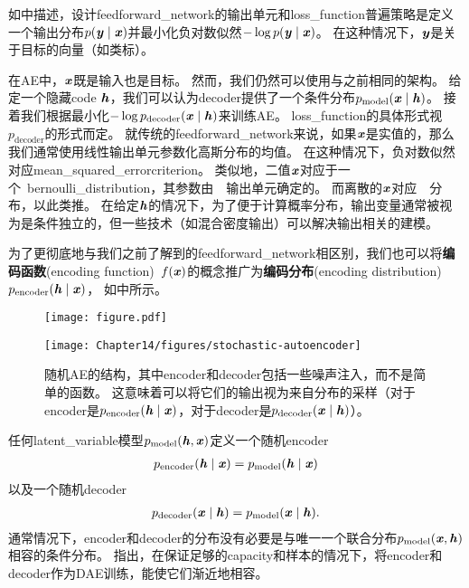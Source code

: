 如中描述，设计\gls{feedforward_network}的输出单元和\gls{loss_function}普遍策略是定义一个输出分布$p(\boldsymbol{\mathit{y}} \mid \boldsymbol{\mathit{x}}) $并最小化负对数似然$-\log p(\boldsymbol{\mathit{y}} \mid \boldsymbol{\mathit{x}})$。
在这种情况下，$\boldsymbol{\mathit{y}}$是关于目标的向量（如类标）。


在\gls{AE}中，$\boldsymbol{\mathit{x}}$既是输入也是目标。
然而，我们仍然可以使用与之前相同的架构。
给定一个隐藏\gls{code} $\boldsymbol{\mathit{h}}$，我们可以认为\gls{decoder}提供了一个条件分布$p_{\text{model}}(\boldsymbol{\mathit{x}} \mid \boldsymbol{\mathit{h}})$。
接着我们根据最小化$-\log p_{\text{decoder}}(\boldsymbol{\mathit{x}} \mid \boldsymbol{\mathit{h}})$来训练\gls{AE}。
\gls{loss_function}的具体形式视$p_{\text{decoder}}$的形式而定。
就传统的\gls{feedforward_network}来说，如果$\boldsymbol{\mathit{x}}$是实值的，那么我们通常使用线性输出单元参数化高斯分布的均值。
在这种情况下，负对数似然对应\gls{mean_squared_error}\gls{criterion}。
类似地，二值$\boldsymbol{\mathit{x}}$对应于一个~\gls{bernoulli_distribution}，其参数由~~输出单元确定的。
而离散的$\boldsymbol{\mathit{x}}$对应~~分布，以此类推。
在给定$\boldsymbol{\mathit{h}}$的情况下，为了便于计算概率分布，输出变量通常被视为是条件独立的，但一些技术（如混合密度输出）可以解决输出相关的建模。


为了更彻底地与我们之前了解到的\gls{feedforward_network}相区别，我们也可以将\textbf{编码函数}(encoding function)~$f(\boldsymbol{\mathit{x}})$的概念推广为\textbf{编码分布}(encoding distribution)~$ p_{\text{encoder}}(\boldsymbol{\mathit{h}} \mid \boldsymbol{\mathit{x}})$， 如中所示。

\begin{figure}[!htb]
\ifOpenSource
\centerline{\texttt{[image: figure.pdf]}}
\else
\centerline{\texttt{[image: Chapter14/figures/stochastic-autoencoder]}}
\fi
\caption{随机\gls{AE}的结构，其中\gls{encoder}和\gls{decoder}包括一些噪声注入，而不是简单的函数。
这意味着可以将它们的输出视为来自分布的采样（对于\gls{encoder}是$p_{\text{encoder}}(\boldsymbol{\mathit{h}} \mid \boldsymbol{\mathit{x}})$，对于\gls{decoder}是$p_{\text{decoder}}(\boldsymbol{\mathit{x}}\mid \boldsymbol{\mathit{h}})$）。}
\label{fig:chap14_stochastic-autoencoder}
\end{figure}

任何\gls{latent_variable}模型$p_{\text{model}}(\boldsymbol{\mathit{h}}, \boldsymbol{\mathit{x}})$定义一个随机\gls{encoder}
\begin{align}
p_{\text{encoder}}(\boldsymbol{\mathit{h}} \mid \boldsymbol{\mathit{x}}) = p_{\text{model}}(\boldsymbol{\mathit{h}}\mid\boldsymbol{\mathit{x}})
\end{align}
以及一个随机\gls{decoder}
\begin{align}
p_{\text{decoder}}(\boldsymbol{\mathit{x}} \mid \boldsymbol{\mathit{h}}) = p_{\text{model}}(\boldsymbol{\mathit{x}}\mid\boldsymbol{\mathit{h}}).
\end{align}
通常情况下，\gls{encoder}和\gls{decoder}的分布没有必要是与唯一一个联合分布$p_{\text{model}}(\boldsymbol{\mathit{x}}, \boldsymbol{\mathit{h}})$相容的条件分布。
\citet{Alain-et-al-arxiv2015}指出，在保证足够的\gls{capacity}和样本的情况下，将\gls{encoder}和\gls{decoder}作为\gls{DAE}训练，能使它们渐近地相容。



